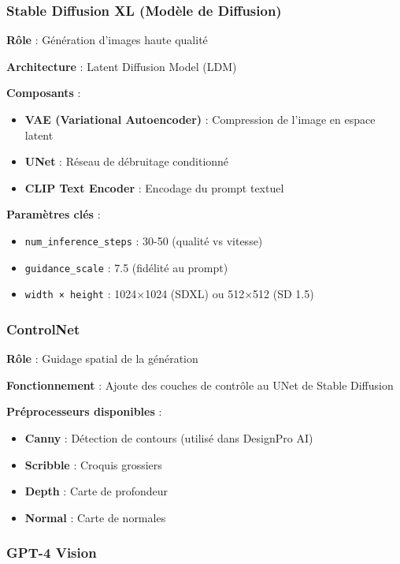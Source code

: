 \subsubsection{Stable Diffusion XL (Modèle de Diffusion)}

\textbf{Rôle} : Génération d'images haute qualité

\textbf{Architecture} : Latent Diffusion Model (LDM) \cite{rombach2022high}

\textbf{Composants} :
\begin{itemize}[leftmargin=*]
    \item \textbf{VAE (Variational Autoencoder)} : Compression de l'image en espace latent
    \item \textbf{UNet} : Réseau de débruitage conditionné
    \item \textbf{CLIP Text Encoder} : Encodage du prompt textuel
\end{itemize}

\textbf{Paramètres clés} :
\begin{itemize}[leftmargin=*]
    \item \texttt{num\_inference\_steps} : 30-50 (qualité vs vitesse)
    \item \texttt{guidance\_scale} : 7.5 (fidélité au prompt)
    \item \texttt{width × height} : 1024×1024 (SDXL) ou 512×512 (SD 1.5)
\end{itemize}

\subsubsection{ControlNet}

\textbf{Rôle} : Guidage spatial de la génération

\textbf{Fonctionnement} : Ajoute des couches de contrôle au UNet de Stable Diffusion

\textbf{Préprocesseurs disponibles} :
\begin{itemize}[leftmargin=*]
    \item \textbf{Canny} : Détection de contours (utilisé dans DesignPro AI)
    \item \textbf{Scribble} : Croquis grossiers
    \item \textbf{Depth} : Carte de profondeur
    \item \textbf{Normal} : Carte de normales
\end{itemize}

\subsubsection{GPT-4 Vision}

